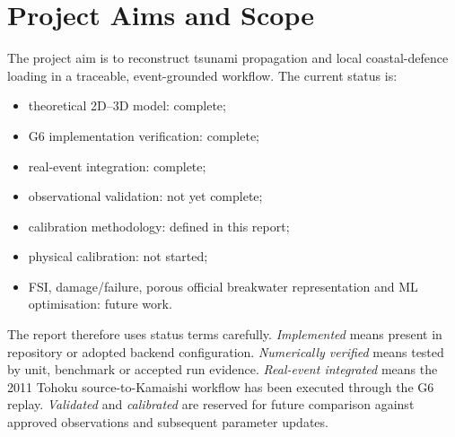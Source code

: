 \section{Project Aims and Scope}

The project aim is to reconstruct tsunami propagation and local coastal-defence loading in a traceable, event-grounded workflow. The current status is:

\begin{itemize}
  \item theoretical 2D--3D model: complete;
  \item G6 implementation verification: complete;
  \item real-event integration: complete;
  \item observational validation: not yet complete;
  \item calibration methodology: defined in this report;
  \item physical calibration: not started;
  \item FSI, damage/failure, porous official breakwater representation and ML optimisation: future work.
\end{itemize}

The report therefore uses status terms carefully. \emph{Implemented} means present in repository or adopted backend configuration. \emph{Numerically verified} means tested by unit, benchmark or accepted run evidence. \emph{Real-event integrated} means the 2011 Tohoku source-to-Kamaishi workflow has been executed through the G6 replay. \emph{Validated} and \emph{calibrated} are reserved for future comparison against approved observations and subsequent parameter updates.
